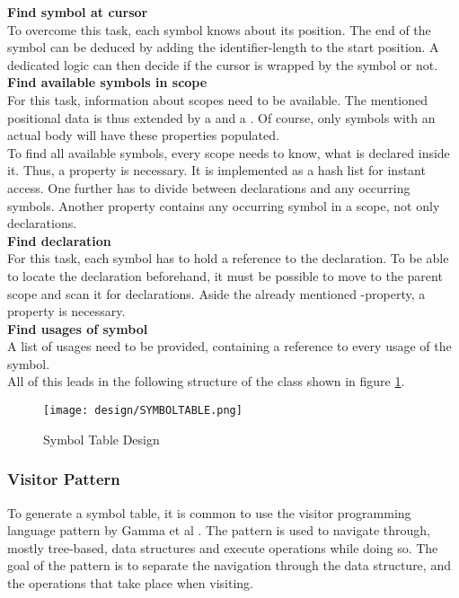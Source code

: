 \textbf{Find symbol at cursor}\\
To overcome this task, each symbol knows about its position.
The end of the symbol can be deduced by adding the identifier-length to the start position.
A dedicated logic can then decide if the cursor is wrapped by the symbol or not.\\

\textbf{Find available symbols in scope}\\
For this task, information about scopes need to be available.
The mentioned positional data is thus extended by a  and a .
Of course, only symbols with an actual body will have these properties populated.\\

To find all available symbols, every scope needs to know, what is declared inside it.
Thus, a property  is necessary.
It is implemented as a hash list for instant access.
One further has to divide between declarations and any occurring symbols.
Another property  contains any occurring symbol in a scope, not only declarations.\\

\textbf{Find declaration}\\
For this task, each symbol has to hold a reference to the declaration.
To be able to locate the declaration beforehand, it must be possible to move to the parent scope and scan it for declarations.
Aside the already mentioned -property, a   property is necessary. \\

\textbf{Find usages of symbol}\\
A list of usages need to be provided, containing a reference to every usage of the symbol. \\

All of this leads in the following structure of the class  shown in figure \ref{fig:symboltabledesign}.

\begin{figure}[H]
    \centering
    \texttt{[image: design/SYMBOLTABLE.png]}
    \caption{Symbol Table Design}
    \label{fig:symboltabledesign}
\end{figure}

\subsubsection{Visitor Pattern}
To generate a symbol table, it is common to use the visitor programming language pattern by Gamma et al \cite{gofBook}. 
The pattern is used to navigate through, mostly tree-based, data structures and execute operations while doing so.
The goal of the pattern is to separate the navigation through the data structure, and the operations that take place when visiting.\\

